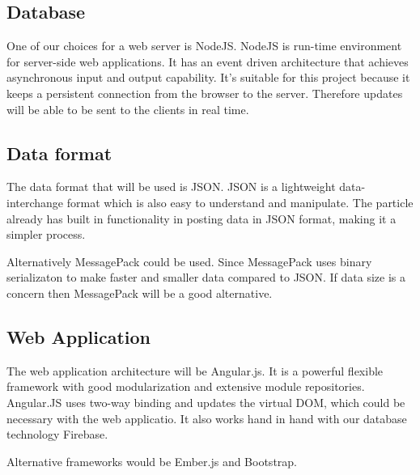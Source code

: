 \documentclass[paper=a4, fontsize=11pt]{scrartcl} %
\begin{document}
	\subsection{Database}
	One of our choices for a web server is NodeJS. NodeJS is run-time environment for server-side web applications. It has an event driven
	architecture that achieves asynchronous input and output capability. It's suitable for this project because it keeps a persistent connection
	from the browser to the server. Therefore updates will be able to be sent to the clients in real time.
	\subsection{Data format}
	The data format that will be used is JSON. JSON is a lightweight data-interchange format which is also easy to understand and
	manipulate. The particle already has built in functionality in posting data in JSON format, making it a simpler process.
	
	Alternatively MessagePack could be used. Since MessagePack uses binary serializaton to make faster and smaller data compared to JSON.
	If data size is a concern then MessagePack will be a good alternative.
	\subsection{Web Application}
	The web application architecture will be Angular.js. It is a powerful flexible framework with good modularization and extensive module
	repositories. Angular.JS uses two-way binding and updates the virtual DOM, which could be necessary with the web applicatio. It also works
	hand in hand with our database technology Firebase.
	
	Alternative frameworks would be Ember.js and Bootstrap.
\end{document}
